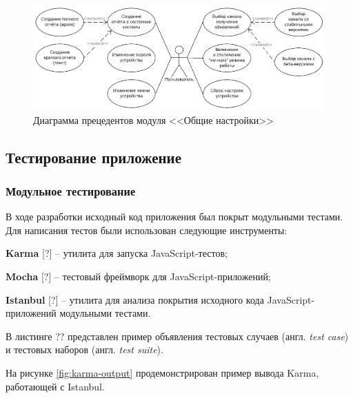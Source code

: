\begin{figure}[h!]
  \centering
  \setlength{\fboxsep}{5pt}
  \includegraphics[width=.85\textwidth]{img/uml/settings_usecase}
  \vspace*{6pt}
  \caption{Диаграмма прецедентов модуля <<Общие настройки>>}
  \label{fig:settings-uml-usecase}
\end{figure}



\subsection{Тестирование приложение}


\subsubsection{Модульное тестирование}

В ходе разработки исходный код приложения был покрыт модульными тестами. Для написания тестов были использован следующие инструменты:
\begin{dashitemize}
  \item \textbf{Karma} [?] -- утилита для запуска JavaScript-тестов;
  \item \textbf{Mocha} [?] -- тестовый фреймворк для JavaScript-приложений;
  \item \textbf{Istanbul} [?] -- утилита для анализа покрытия исходного кода JavaScript-приложений модульными тестами.
\end{dashitemize}

В листинге ?? представлен пример объявления тестовых случаев (англ. \emph{test case}) и тестовых наборов (англ. \emph{test suite}).

{\color{gray}{*listing*}}

На рисунке \ref{fig:karma-output} продемонстрирован пример вывода Karma, работающей с Istanbul.


